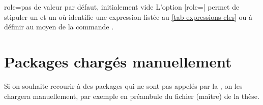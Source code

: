 
\begin{docKey}{role}{=}{pas de valeur par défaut, initialement
    vide}
  L'option |role=| permet de stipuler un  et
  un  où  identifie une expression listée au
  \vref{tab-expressions-cles} ou à définir au moyen de la commande
  .
\end{docKey}

\section{Packages chargés manuellement}
\label{sec-options-de-classes}
Si on souhaite recourir à des packages qui ne sont pas appelés par la \yatCl{},
on les chargera manuellement, par exemple en préambule du fichier (maître) de
la thèse.

